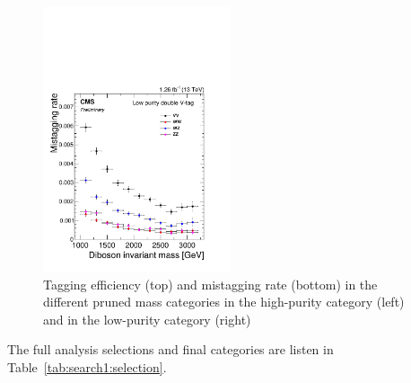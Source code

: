 \begin{figure}[htb]
\includegraphics[width=0.49\textwidth]{figures/analysis/search1/AN-15-211/QCD_LP_VV_MistaggingRateEff.pdf}
\caption{Tagging efficiency (top) and mistagging rate (bottom) in the different pruned mass categories in the high-purity category (left) and in the low-purity category (right)}
\label{fig:search1:sigeff}
\end{figure}

The full analysis selections and final categories are listen in Table~\ref{tab:search1:selection}.


